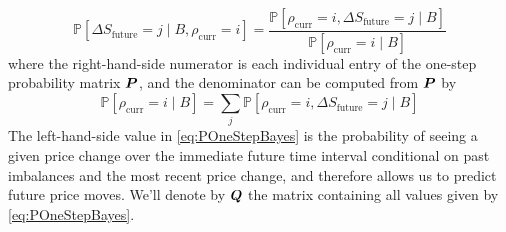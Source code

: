 \begin{equation}\label{eq:POneStepBayes}
\mathbb{P}\left[ \Delta S_\text{future} = j \; | \; B, \rho_\text{curr} = i \right] = \dfrac{\mathbb{P}\left[ \rho_\text{curr} = i, \Delta S_\text{future} = j \; | \; B \right]}{\mathbb{P}\left[ \rho_\text{curr} = i \; | \; B \right]}
\end{equation}
where the right-hand-side numerator is each individual entry of the one-step probability matrix $\boldsymbol{P}$, and the denominator can be computed from $\boldsymbol{P}$ by
\begin{equation}\label{eq:POneStepBayesDenom}
\mathbb{P}\left[ \rho_\text{curr} = i \; | \; B \right] = \sum\limits_j \mathbb{P}\left[ \rho_\text{curr} = i,  \Delta S_\text{future} = j \; | \; B \right]
\end{equation}
The left-hand-side value in \eqref{eq:POneStepBayes} is the probability of seeing a given price change over the immediate future time interval conditional on past imbalances and the most recent price change, and therefore allows us to predict future price moves. We'll denote by $\boldsymbol{Q}$ the matrix containing all values given by \eqref{eq:POneStepBayes}.


